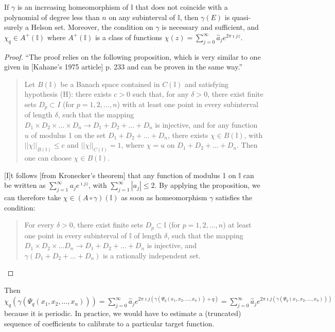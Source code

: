 \begin{proposition}
  \label{prop:Helson}
  If $\gamma$ is an increasing homeomorphism of $\mathbb{I}$ that does not coincide with a polynomial of degree less than $n$ on any subinterval of $\mathbb{I}$, then $\gamma\left(E\right)$ is quasi-surely a Helson set. Moreover, the condition on $\gamma$ is necessary and sufficient, and $\chi_q \in A^+\left(\mathbb{I}\right)$ where $A^+\left(\mathbb{I}\right)$ is a class of functions $\chi\left(z\right) = \sum\limits_{j = 0}^\infty \widehat{a}_j e^{2\pi \imath j z}$.
\end{proposition}
\begin{proof}
   ``The proof relies on the following proposition, which is very similar to one given in [Kahane's 1975 article] p. 233 and can be proven in the same way.'' 
   \begin{quote}
    Let $B\left(\mathbb{I}\right)$ be a Banach space contained in $C\left(\mathbb{I}\right)$ and satisfying hypothesis (H): there exists $c > 0$ such that, for any $\delta > 0$, there exist finite sets $D_p\subset I$ (for $p = 1, 2, \ldots, n$) with at least one point in every subinterval of length $\delta$, such that the mapping $D_1\times D_2\times \dots \times D_n \to D_1 + D_2 + \ldots + D_n$ is injective, and for any function $u$ of modulus 1 on the set $D_1 + D_2 + \ldots + D_n$, there exists $\chi\in B\left(\mathbb{I}\right)$, with $\left|\left|\chi\right|\right|_{B\left(\mathbb{I}\right)} \leq c$ and $\left|\left|\chi\right|\right|_{C\left(\mathbb{I}\right)} = 1$, where $\chi = u$ on $D_1 + D_2 + \ldots + D_n$. Then one can choose $\chi \in B\left(\mathbb{I}\right)$.
    \end{quote}
    [I]t follows [from Kronecker's theorem] that any function of modulus 1 on $\mathbb{I}$ can be written as $\sum\limits_{j = 1}^\infty a_j e^{\imath j z}$, with $\sum\limits_{j = 1}^\infty \left|a_j\right| \leq 2$. By applying the proposition, we can therefore take $\chi \in (A \circ \gamma)\left(\mathbb{I}\right)$ as soon as homeomorphism $\gamma$ satisfies the condition:
    \begin{quote}
    For every $\delta > 0$, there exist finite sets $D_p \subset \mathbb{I}$ (for $p = 1, 2, \ldots, n$) at least one point in every subinterval of $\mathbb{I}$ of length $\delta$, such that the mapping $D_1 \times D_2\times \ldots D_n \to D_1 + D_2 + \ldots + D_n$ is injective, and $\gamma(D_1 + D_2 + \ldots + D_n)$ is a rationally independent set.
   \end{quote}
\end{proof}

Then $\chi_q\left(\gamma\left(\Psi_q\left(x_1, x_2, \dots, x_n\right)\right)\right) = \sum\limits_{j = 0}^\infty \widehat{a}_j e^{2\pi \imath j \left(\gamma\left(\Psi_q\left(x_1, x_2, \dots, x_n\right)\right) + q\right)} = \sum\limits_{j = 0}^\infty \widehat{a}_j e^{2\pi \imath j \left(\gamma\left(\Psi_q\left(x_1, x_2, \dots, x_n\right)\right)\right)}$ because it is periodic. In practice, we would have to estimate a (truncated) sequence of coefficients to calibrate to a particular target function.